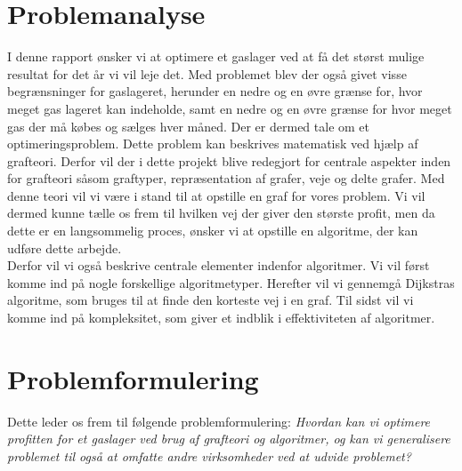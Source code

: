 \section{Problemanalyse}
I denne rapport ønsker vi at optimere et gaslager ved at få det størst mulige resultat for det år vi vil leje det. Med problemet blev der også givet visse begrænsninger for gaslageret, herunder en nedre og en øvre grænse for, hvor meget gas lageret kan indeholde, samt en nedre og en øvre grænse for hvor meget gas der må købes og sælges hver måned. Der er dermed tale om et optimeringsproblem. Dette problem kan beskrives matematisk ved hjælp af grafteori. Derfor vil der i dette projekt blive redegjort for centrale aspekter inden for grafteori såsom
graftyper, repræsentation af grafer, veje og delte grafer. Med denne teori vil vi være i stand til at opstille en graf for vores problem. Vi vil dermed kunne tælle os frem til hvilken vej der giver den største profit, men da dette er en langsommelig proces, ønsker vi at opstille en algoritme, der kan udføre dette arbejde. \\ Derfor vil vi også beskrive centrale elementer indenfor algoritmer. Vi vil først komme ind på nogle forskellige algoritmetyper. Herefter vil vi gennemgå Dijkstras algoritme, som bruges til at finde den korteste vej i en graf. Til sidst vil vi komme ind på kompleksitet, som giver et indblik i effektiviteten af algoritmer.

\section{Problemformulering}
Dette leder os frem til følgende problemformulering:
\textit{Hvordan kan vi optimere profitten for et gaslager ved brug af grafteori og algoritmer, og kan vi generalisere problemet til også at omfatte andre virksomheder ved at udvide problemet?}


